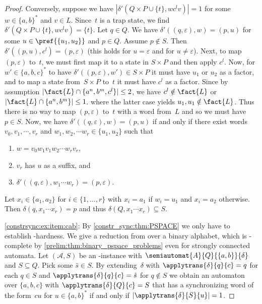 \begin{proof}
	Conversely, suppose we have $|\delta'(Q \times P \cup \{t\}, wc^lv)| = 1$
	for some $w \in \{a,b\}^*$ and $v \in L$.
	Since~$t$ is a trap state, we find $\delta'(Q \times P \cup \{t\}, wc^lv) = \{t\}$.
	Let $q \in Q$.
	We have $\delta'((q, \varepsilon), w) = (p, u)$
	for some $u \in \pref{\{u_1, u_2\}}$ and $p \in Q$. Assume $p \notin S$.
	Then $\delta'((p, u), c^l) = (p, \varepsilon)$ (this holds for $u = \varepsilon$ and 
	for $u \ne \varepsilon$).	
	Next, to map $(p, \varepsilon)$ to~$t$, we must first map it to a state
	in $S \times P$ and then apply $c^l$.	
	Now, for $w' \in \{a,b,c\}^*$
	to have $\delta'((p, \varepsilon), w') \in S \times P$
	it must have $u_1$ or $u_2$ as a factor,
	and to map a state from~$S \times P$
	to~$t$ it must have $c^l$ as a factor.
	Since by assumption $|\fact{L} \cap \{a^n, b^m, c^l\}| \le 2$,
	we have $c^l \notin \fact{L}$
	or $|\fact{L} \cap \{a^n, b^m\}| \le 1$.
	where the latter case yields $u_1, u_1 \notin \fact{L}$.
	Thus there is no way to map $(p, \varepsilon)$
	to~$t$ with a word from~$L$	and so we must have $p \in S$.
	Now, we have $\delta'((q, \varepsilon), w) = (p, u)$
	if and only if
	there exist words $v_0, v_1, \cdots, v_r$ 
	and $w_1, w_2, \cdots w_r \in \{u_1, u_2\}$
	such that
	\begin{enumerate}
	\item $w = v_0 w_1 v_1 w_2 \cdots w_r v_r$,
		
	\item $v_r$ has $u$ as a suffix, and
	
	\item $\delta'((q, \varepsilon), w_1 \cdots w_r) = (p, \varepsilon)$. 	
	\end{enumerate}
	Let $x_i \in \{a_1, a_2\}$ for $i \in\{1,\ldots,r\}$
	with $x_i = a_1$ if $w_i = u_1$
	and $x_i = a_2$ otherwise.
	Then $\delta(q, x_1 \cdots x_r) = p$
	and thus $\delta(Q, x_1 \cdots x_r) \subseteq S$.
	
	
	\ref{constrsync:ex:item:cab}: By \cref{constr_sync:thm:PSPACE} we only have to establish \PSPACE-hardness.
	We give a reduction from \SFS over a binary alphabet, which is \PSPACE-complete
	by \cref{prelim:thm:binary_pspace_problems} even for strongly connected automata.
	Let $(\mathcal A, S)$ be
	an \SFS-instance with $\semiautomat{A}{Q}{\{a,b\}}{\delta}$
	and $S \subseteq Q$. Pick some $\hat s \in S$.
	By extending~$\delta$ with $\applytrans{\delta}{q}{c} = q$ for each $q \in S$
	and $\applytrans{\delta}{q}{c} = \hat s$ for $q \notin S$
	we obtain an automaton over $\{a,b,c\}$ with 
	$\applytrans{\delta}{Q}{c} = S$
	that has a synchronizing word of the form~$cu$ for $u \in \{a,b\}^*$
	if and only if $|\applytrans{\delta}{S}{u}| = 1$.	
\end{proof}